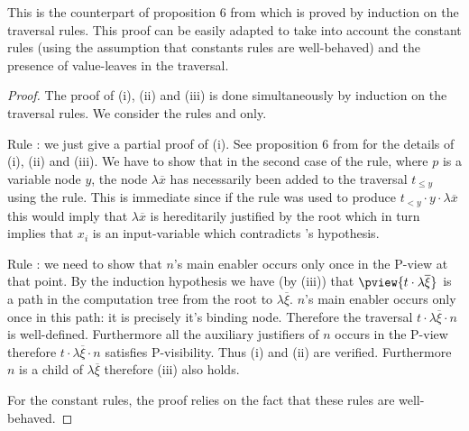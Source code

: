 This is the counterpart of proposition 6 from
\cite{OngHoMchecking2006} which is proved by induction on the
traversal rules. This proof can be easily adapted to take into
account the constant rules (using the assumption that constants
rules are well-behaved) and the presence of value-leaves in the
traversal.
\begin{proof}
The proof of (i), (ii) and (iii) is done simultaneously by induction on the traversal rules. We consider the rules  and  only.

Rule : we just give a partial proof of (i). See proposition 6 from \cite{OngHoMchecking2006} for the details of (i), (ii) and (iii). We have to show that in the second case of the  rule, where $p$ is a variable node $y$, the node $\lambda \overline{x}$ has necessarily been added to the traversal $t_{\leq y}$ using the  rule. This is immediate since if the rule  was used to produce $t_{<y} \cdot y \cdot \lambda \overline{x}$ this would imply that $\lambda \overline{x}$ is hereditarily justified by the root which in turn implies that $x_i$ is an input-variable which contradicts 's hypothesis.

Rule : we need to show that $n$'s main enabler occurs only once in the P-view at that point. By the induction hypothesis we have (by (iii)) that $\pview{t \cdot \lambda \overline{\xi}}$ is a path in the computation tree from the root to $\lambda \overline{\xi}$. $n$'s main enabler occurs only once in this path: it is precisely it's binding node. Therefore the traversal $t \cdot \lambda \overline{\xi} \cdot n$ is well-defined. Furthermore all the auxiliary justifiers of $n$ occurs in the P-view therefore $t \cdot \lambda \overline{\xi} \cdot n$ satisfies P-visibility. Thus (i) and (ii) are verified. Furthermore $n$ is a child of $\lambda \overline{\xi}$ therefore (iii) also holds.

For the constant rules, the proof relies on the fact that these rules are well-behaved.
\end{proof}

